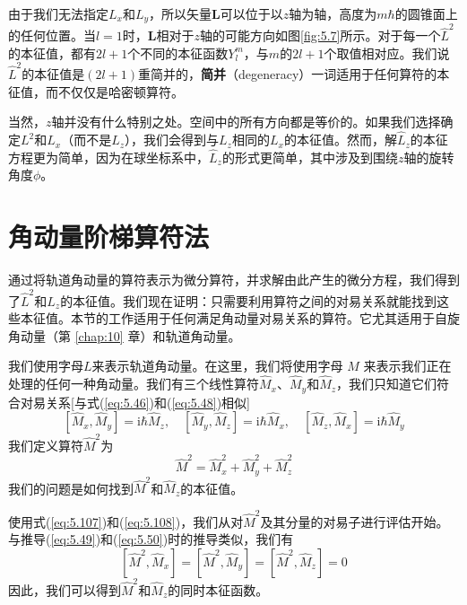     由于我们无法指定$L_x$和$L_y$，所以矢量$\mathbf{L}$可以位于以$z$轴为轴，高度为$m\hbar$的圆锥面上的任何位置。当$l=1$时，$\mathbf{L}$相对于$z$轴的可能方向如图\ref{fig:5.7}所示。对于每一个$\hat{L}^2$的本征值，都有$2l+1$个不同的本征函数$Y_l^m$，与$m$的$2l+1$个取值相对应。我们说$\hat{L}^2$的本征值是$\left(2l+1\right)$重简并的，\textbf{简并}（degeneracy）一词适用于任何算符的本征值，而不仅仅是哈密顿算符。

    当然，$z$轴并没有什么特别之处。空间中的所有方向都是等价的。如果我们选择确定$L^2$和$L_x$（而不是$L_z$），我们会得到与$L_z$相同的$L_x$的本征值。然而，解$\hat{L}_z$的本征方程更为简单，因为在球坐标系中，$\hat{L}_z$的形式更简单，其中涉及到围绕$z$轴的旋转角度$\phi$。

\section{角动量阶梯算符法}
\label{sec:5.4 The Ladder-Operator Method for Angular Momentum}
    通过将轨道角动量的算符表示为微分算符，并求解由此产生的微分方程，我们得到了$\hat{L}^2$和$\hat{L}_z$的本征值。我们现在证明：只需要利用算符之间的对易关系就能找到这些本征值。本节的工作适用于任何满足角动量对易关系的算符。它尤其适用于自旋角动量（第 \ref{chap:10} 章）和轨道角动量。

    我们使用字母$L$来表示轨道角动量。在这里，我们将使用字母 $M$ 来表示我们正在处理的任何一种角动量。我们有三个线性算符$\hat{M}_x$、$\hat{M}_y$和$\hat{M}_z$，我们只知道它们符合对易关系[与式(\ref{eq:5.46})和(\ref{eq:5.48})相似]
    \begin{equation}
        \left[\hat{M}_x,\hat{M}_y\right] = \mathrm{i}\hbar\hat{M}_z, \quad \left[\hat{M}_y,\hat{M}_z\right] = \mathrm{i}\hbar\hat{M}_x, \quad \left[\hat{M}_z,\hat{M}_x\right] = \mathrm{i}\hbar\hat{M}_y
        \label{eq:5.107}
    \end{equation}
    我们定义算符$\hat{M}^2$为
    \begin{equation}
        \hat{M}^2 = \hat{M}_x^2 + \hat{M}_y^2 + \hat{M}_z^2
        \label{eq:5.108}
    \end{equation}
    我们的问题是如何找到$\hat{M}^2$和$\hat{M}_z$的本征值。

    使用式(\ref{eq:5.107})和(\ref{eq:5.108})，我们从对$\hat{M}^2$及其分量的对易子进行评估开始。与推导(\ref{eq:5.49})和(\ref{eq:5.50})时的推导类似，我们有
    \begin{equation}
        \left[\hat{M}^2,\hat{M}_x\right] = \left[\hat{M}^2,\hat{M}_y\right] = \left[\hat{M}^2,\hat{M}_z\right] = 0
        \label{eq:5.109}
    \end{equation}
    因此，我们可以得到$\hat{M}^2$和$\hat{M}_z$的同时本征函数。

